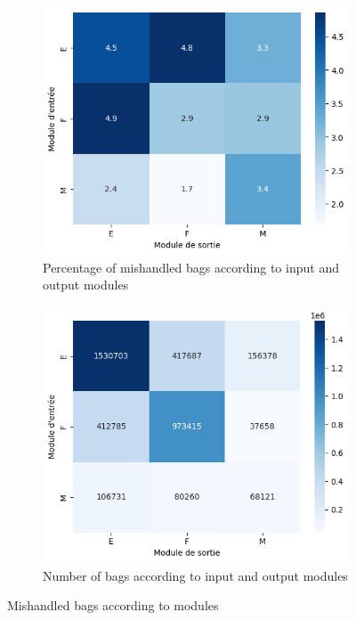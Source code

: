 \documentclass[12pt]{article}
\begin{document}
\FloatBarrier
\begin{figure}[ht]
  \centering
  \begin{subfigure}{0.48\textwidth}
    \includegraphics[width=\linewidth]{percentage of failed per module.png}
    \caption{Percentage of mishandled bags according to input and output modules}
    \label{fig:Percentage of mishandled bags according to input and output modules}
  \end{subfigure}
  \hfill
  \begin{subfigure}{0.48\textwidth}
    \includegraphics[width=\linewidth]{number of bags per module.png}
    \caption{Number of bags according to input and output modules}
    \label{fig:Number of bags according to input and output modules}
  \end{subfigure}
  \caption{Mishandled bags according to modules}
  \label{fig:Mishandled bags according to modules}
\end{figure}
\FloatBarrier



\newpage
\FloatBarrier
\printglossaries
\FloatBarrier


\newpage
\printbibliography
\end{document}
